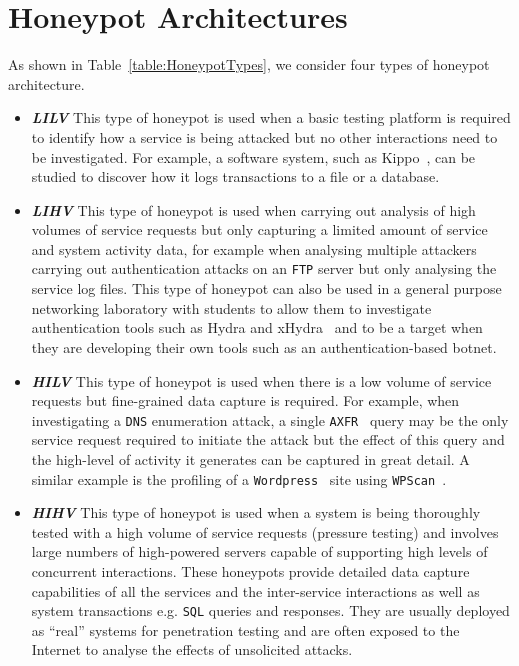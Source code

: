 \documentclass{llncs}
\begin{document}
\section{Honeypot Architectures}

As shown in Table~\ref{table:HoneypotTypes}, we consider four types 
of honeypot architecture.

\begin{itemize}

  \item \noindent \emph{\textbf{LILV}} This type of honeypot is used when a
    basic testing platform is required to identify how a service is being
    attacked but no other interactions need to be investigated. For example, a
    software system, such as Kippo~\cite{D:16,SH:15}, can be studied to
    discover how it logs transactions to a file or a database. 

  \item \noindent \emph{\textbf{LIHV}} This type of honeypot is used when
    carrying out analysis of high volumes of service requests but only
    capturing a limited amount of service and system activity data, for example
    when analysing multiple attackers carrying out authentication attacks on an
    \texttt{FTP} server but only analysing the service log files. This type of
    honeypot can also be used in a general purpose networking laboratory with
    students to allow them to investigate authentication tools such as Hydra
    and xHydra~\cite{RS:15} and to be a target when they are developing their
    own tools such as an authentication-based botnet.

  \item \noindent \emph{\textbf{HILV}} This type of honeypot is used when there
    is a low volume of service requests but fine-grained data capture is
    required. For example, when investigating a \texttt{DNS} enumeration
    attack, a single \texttt{AXFR}~\cite{EL:10} query may be the only service
    request required to initiate the attack but the effect of this query and
    the high-level of activity it generates can be captured in great detail.  A
    similar example is the profiling of a \texttt{Wordpress}~\cite{WP:17} site
    using \texttt{WPScan}~\cite{WT:17}.

  \item \noindent \emph{\textbf{HIHV}} This type of honeypot is used when a
    system is being thoroughly tested with a high volume of service requests
    (pressure testing) and involves large numbers of high-powered servers capable
    of supporting high levels of concurrent interactions. These honeypots
    provide detailed data capture capabilities of all the services and the
    inter-service interactions as well as system transactions e.g. \texttt{SQL}
    queries and responses. They are usually deployed as ``real'' systems for
    penetration testing and are often exposed to the Internet to analyse the
    effects of unsolicited attacks.  

\end{itemize}
\end{document}
